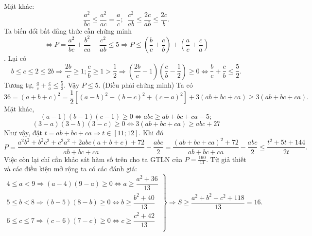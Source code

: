 Mặt khác: \[\frac{{{a}^{2}}}{bc}\le \frac{{{a}^{2}}}{ac}=\frac{a}{c};\,\,\,\frac{{{c}^{2}}}{ab}\le \frac{2c}{ab}\le \frac{2c}{b}.\]
Ta biến đổi bất đẳng thức cần chứng minh\[\Leftrightarrow P=\frac{{{a}^{2}}}{bc}+\frac{{{b}^{2}}}{ca}+\frac{{{c}^{2}}}{ab}\le 5\Rightarrow P\le \left( \frac{b}{c}+\frac{c}{b} \right)+\left( \frac{a}{c}+\frac{c}{a} \right)\].
Lại có \[b\le c\le 2\le 2b\Rightarrow \frac{2b}{c}\ge 1;\frac{c}{b}\ge 1>\frac{1}{2}\Rightarrow \left( \frac{2b}{c}-1 \right)\left( \frac{c}{b}-\frac{1}{2} \right)\ge 0\Leftrightarrow \frac{b}{c}+\frac{c}{b}\le \frac{5}{2}.\]
Tương tự, $\frac{a}{c}+\frac{c}{a}\le \frac{5}{2}$. Vậy $P\le 5$. (Điều phải chứng minh)
\hda  Ta có \[36={{\left( a+b+c \right)}^{2}}=\frac{1}{2}\left[ {{\left( a-b \right)}^{2}}+{{\left( b-c \right)}^{2}}+{{\left( c-a \right)}^{2}} \right]+3\left( ab+bc+ca \right)\ge 3\left( ab+bc+ca \right).\]
Mặt khác,
\[\left( a-1 \right)\left( b-1 \right)\left( c-1 \right)\ge 0\Leftrightarrow abc\ge ab+bc+ca-5;\]
\[\left( 3-a \right)\left( 3-b \right)\left( 3-c \right)\ge 0\Leftrightarrow 3\left( ab+bc+ca \right)\ge abc+27\]
Như vậy, đặt $t=ab+bc+ca\Rightarrow t\in \left[ 11;12 \right]$.
Khi đó \[P=\frac{{{a}^{2}}{{b}^{2}}+{{b}^{2}}{{c}^{2}}+{{c}^{2}}{{a}^{2}}+2abc\left( a+b+c \right)+72}{ab+bc+ca}-\frac{abc}{2}=\frac{{{\left( ab+bc+ca \right)}^{2}}+72}{ab+bc+ca}-\frac{abc}{2}\le \frac{{{t}^{2}}+5t+144}{2t}.\]
Việc còn lại chỉ cần khảo sát hàm số trên cho ta GTLN của $P=\frac{160}{11}$.
\hda  Từ giả thiết và các điều kiện mở rộng ta có các đánh giá:
	\[\left. \begin{array}{l}
4\le a<9\Rightarrow \left( a-4 \right)\left( 9-a \right)\ge 0\Leftrightarrow a\ge \dfrac{{{a}^{2}}+36}{13} \\ 
5\le b<8\Rightarrow \left( b-5 \right)\left( 8-b \right)\ge 0\Leftrightarrow b\ge \dfrac{{{b}^{2}}+40}{13} \\ 
6\le c\le 7\Rightarrow \left( c-6 \right)\left( 7-c \right)\ge 0\Leftrightarrow c\ge \dfrac{{{c}^{2}}+42}{13} \\ 
\end{array} \right\}\Rightarrow S\ge \frac{{{a}^{2}}+{{b}^{2}}+{{c}^{2}}+118}{13}=16.\]
